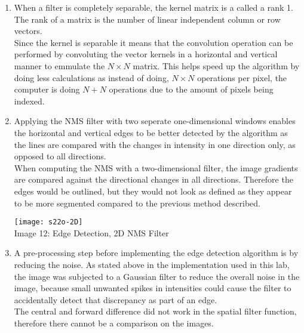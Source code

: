\documentclass{article}
\begin{document}
	\begin{enumerate}
		\item When a filter is completely separable, the kernel matrix is a called a rank 1. The rank of a matrix is the number of linear independent column or row vectors.\\ 
		
		Since the kernel is separable it means that the convolution operation can be performed by convoluting the vector kernels in a horizontal and vertical manner to emmulate the $N \times N$ matrix. This helps speed up the algorithm by doing less calculations as instead of doing, $N \times N$ operations per pixel, the computer is doing $N + N$ operations due to the amount of pixels being indexed.
		
		\item Applying the NMS filter with two seperate one-dimensional windows enables the horizontal and vertical edges to be better detected by the algorithm as the lines are compared with the changes in intensity in one direction only, as opposed to all directions.\\
		
		When computing the NMS with a two-dimensional filter, the image gradients are compared against the directional changes in all directions. Therefore the edges would be outlined, but they would not look as defined as they appear to be more segmented compared to the previous method described.\\
		
		\begin{center}
			\noindent \texttt{[image: s22o-2D]}\\
			Image 12: Edge Detection, 2D NMS Filter\\
		\end{center}
		
		\item A pre-processing step before implementing the edge detection algorithm is by reducing the noise. As stated above in the implementation used in this lab, the image was subjected to a Gaussian filter to reduce the overall noise in the image, because small unwanted spikes in intensities could cause the filter to accidentally detect that discrepancy as part of an edge.\\
		
		The central and forward difference did not work in the spatial filter function, therefore there cannot be a comparison on the images. 
		
	\end{enumerate}
	
\end{document}
